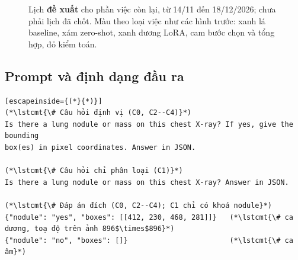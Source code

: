\begin{figure}[H]
\centering
{}
\caption{Lịch \textbf{đề xuất} cho phần việc còn lại, từ 14/11 đến 18/12/2026; chưa phải lịch đã chốt. Màu theo
loại việc như các hình trước: xanh lá baseline, xám zero-shot, xanh dương LoRA, cam bước chọn và tổng hợp, đỏ kiểm toán.}
\label{fig:gantt}
\end{figure}

\subsection{Prompt và định dạng đầu ra}

\begin{lstlisting}[escapeinside={(*}{*)}]
(*\lstcmt{\# Câu hỏi định vị (C0, C2--C4)}*)
Is there a lung nodule or mass on this chest X-ray? If yes, give the bounding
box(es) in pixel coordinates. Answer in JSON.

(*\lstcmt{\# Câu hỏi chỉ phân loại (C1)}*)
Is there a lung nodule or mass on this chest X-ray? Answer in JSON.

(*\lstcmt{\# Đáp án đích (C0, C2--C4); C1 chỉ có khoá nodule}*)
{"nodule": "yes", "boxes": [[412, 230, 468, 281]]}   (*\lstcmt{\# ca dương, toạ độ trên ảnh 896$\times$896}*)
{"nodule": "no", "boxes": []}                        (*\lstcmt{\# ca âm}*)
\end{lstlisting}

